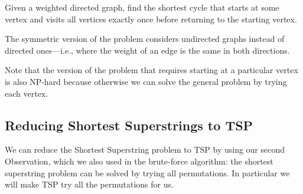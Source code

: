 \begin{cluster}
\label{grp:prb:genome::the-asymmetric-traveling-salesperson-problem-atsp}

\begin{problem}
\label{prb:genome::the-asymmetric-traveling-salesperson-problem-atsp}
  Given a weighted directed graph, find the shortest cycle that starts
  at some vertex and visits all vertices exactly once before returning
  to the starting vertex.

\end{problem}
\end{cluster}

\begin{cluster}
\label{grp:grm:genome::symmetric}

\begin{gram}
\label{grm:genome::symmetric}
The symmetric version of the problem considers undirected graphs
instead of directed ones---i.e., where the weight of an edge is the
same in both directions.

\end{gram}
\end{cluster}

\begin{cluster}
\label{grp:nt:genome::version}

\begin{note}
\label{nt:genome::version}
  Note that the version of the problem that requires starting at a
  particular vertex is also NP-hard because otherwise we can solve the
  general problem by trying each vertex.

\end{note}
\end{cluster}


\subsection{Reducing Shortest Superstrings to TSP}
\label{sec:genome::reducing-shortest-superstrings-to-tsp}

\begin{cluster}
\label{grp:grm:genome::reduce}

\begin{gram}
\label{grm:genome::reduce}
We can reduce the Shortest Superstring problem to TSP by using 
our second Observation, which we also used in the brute-force
algorithm: the shortest superstring problem can be solved by trying
all permutations.
In particular we will make TSP try all the permutations for us.

\end{gram}
\end{cluster}

